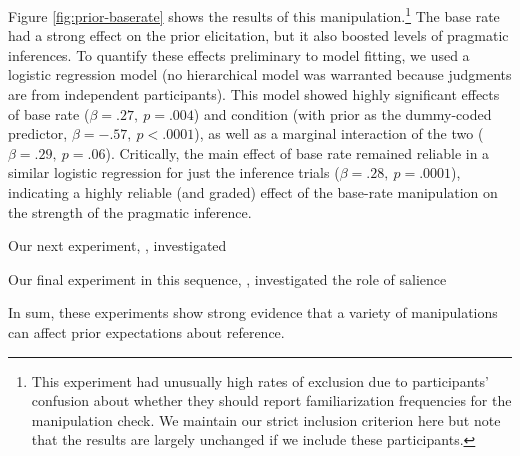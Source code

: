 Figure \ref{fig:prior-baserate} shows the results of this manipulation.\footnote{This experiment had unusually high rates of exclusion due to participants' confusion about whether they should report  familiarization frequencies for the manipulation check. We maintain our strict inclusion criterion here but note that the results are largely unchanged if we include these participants.}  The base rate had a strong effect on the prior elicitation, but it also boosted levels of pragmatic inferences. To quantify these effects preliminary to model fitting, we used a logistic regression model (no hierarchical model was warranted because judgments are from independent participants). This model showed highly significant effects of base rate ($\beta = .27,~p = .004$) and condition  (with prior as the dummy-coded predictor, $\beta = -.57,~p < .0001$), as well as a marginal interaction of the two  ($\beta = .29,~p = .06$). Critically, the main effect of base rate remained reliable in a similar logistic regression for just the inference trials ($\beta = .28,~p = .0001$), indicating a highly reliable (and graded) effect of the base-rate manipulation on the strength of the pragmatic inference.

Our next experiment, , investigated 


Our final experiment in this sequence, , investigated the role of salience 


In sum, these experiments show strong evidence that a variety of manipulations can affect prior expectations about reference.  